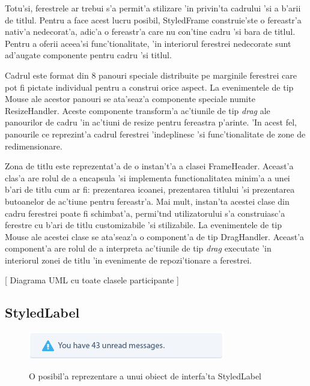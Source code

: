\medskip

Totu'si, ferestrele ar trebui s'a permit'a stilizare 'in privin'ta cadrului 'si a b'arii de titlul. Pentru a face acest lucru posibil, StyledFrame construie'ste o fereastr'a nativ'a nedecorat'a, adic'a o fereastr'a care nu con'tine cadru 'si bara de titlul. Pentru a oferii aceea'si func'tionalitate, 'in interiorul ferestrei nedecorate sunt ad'augate componente pentru cadru 'si titlul. 

\medskip

Cadrul este format din 8 panouri speciale distribuite pe marginile ferestrei care pot fi pictate individual pentru a construi orice aspect. La evenimentele de tip Mouse ale acestor panouri se ata'seaz'a componente speciale numite ResizeHandler. Aceste componente transform'a ac'tiunile de tip \emph{drag} ale panourilor de cadru 'in ac'tiuni de resize pentru fereastra p'arinte. 'In acest fel, panourile ce reprezint'a cadrul ferestrei 'indeplinesc 'si func'tionalitate de zone de redimensionare.

\medskip

Zona de titlu este reprezentat'a de o instan't'a a clasei FrameHeader. Aceast'a clas'a are rolul de a encapsula 'si implementa functionalitatea minim'a a unei b'ari de titlu cum ar fi: prezentarea icoanei, prezentarea titlului 'si prezentarea butoanelor de ac'tiune pentru fereastr'a. Mai mult, instan'ta acestei clase din cadru ferestrei poate fi schimbat'a, permi't{\ia}nd utilizatorului s'a construiasc'a ferestre cu b'ari de titlu customizabile 'si stilizabile. La evenimentele de tip Mouse ale acestei clase se ata'seaz'a o component'a de tip DragHandler. Aceast'a component'a are rolul de a interpreta ac'tiunile de tip \emph{drag} executate 'in interiorul zonei de titlu 'in evenimente de repozi'tionare a ferestrei.

\medskip

[ Diagrama UML cu toate clasele participante ]


\subsection{StyledLabel}

\begin{center}
\begin{figure}[h]
    \centering
    \includegraphics{img/ch5_styledlabel.png}
    \label{fig:fig_5_1}
    \caption{O posibil'a reprezentare a unui obiect de interfa'ta StyledLabel}
\end{figure}
\end{center}



